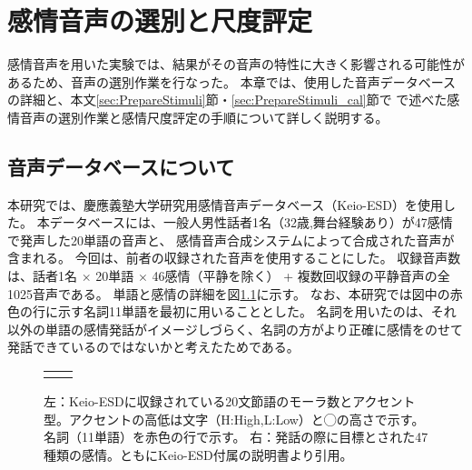 \chapter{感情音声の選別と尺度評定}
\label{sec:DBScreening}
感情音声を用いた実験では、結果がその音声の特性に大きく影響される可能性があるため、音声の選別作業を行なった。
本章では、使用した音声データベースの詳細と、本文\ref{sec:PrepareStimuli}節・\ref{sec:PrepareStimuli_cal}節で
で述べた感情音声の選別作業と感情尺度評定の手順について詳しく説明する。

\section{音声データベースについて}
\label{sec:Keio-ESD}
本研究では、慶應義塾大学研究用感情音声データベース（Keio-ESD）\cite{keioESD-J}を使用した。
本データベースには、一般人男性話者1名（32歳,舞台経験あり）が47感情で発声した20単語の音声と、
感情音声合成システムによって合成された音声が含まれる。
今回は、前者の収録された音声を使用することにした。
収録音声数は、話者1名 $\times$ 20単語 $\times$ 46感情（平静を除く） + 複数回収録の平静音声の全1025音声である。
単語と感情の詳細を図\ref{fig:Keio-ESD}に示す。
なお、本研究では図中の赤色の行に示す名詞11単語を最初に用いることとした。
名詞を用いたのは、それ以外の単語の感情発話がイメージしづらく、名詞の方がより正確に感情をのせて発話できているのではないかと考えたためである。



\begin{figure}[t]

  \begin{tabular}{cc}
  \begin{minipage} {0.45\hsize}
  \centering
  \includegraphics [ width = 1\columnwidth]{Figure/Appendix/6A/Table_Keio-ESD_Vocab.eps}
  \end{minipage} & 
  
  \begin{minipage} {0.55\hsize}
  \centering
  \includegraphics [ width = 1\columnwidth]{Figure/Appendix/6A/Table_Keio-ESD_Emo47.eps}
  \end{minipage}
  
  \end{tabular}
  
  \caption{左：Keio-ESDに収録されている20文節語のモーラ数とアクセント型。アクセントの高低は文字（H:High,L:Low）と◯の高さで示す。
           名詞（11単語）を赤色の行で示す。
           右：発話の際に目標とされた47種類の感情。ともにKeio-ESD付属の説明書より引用。
            }
  \label{fig:Keio-ESD} 

\end{figure}



